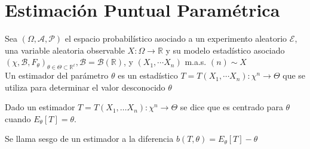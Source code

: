 \section{Estimación Puntual Paramétrica}

\begin{definición}[Estimador]
  Sea $(\Omega, \mathcal{A}, \mathcal{P})$ el espacio probabilístico asociado a un experimento aleatorio $\mathcal{E}$, una variable aleatoria observable $X: \Omega \longrightarrow \mathbb{R}$ y su modelo estadístico asociado $\left(\chi, \mathcal{B}, F_{\theta}\right)_{\theta \in \Theta \subset \mathbb{R}^{\ell}}, \mathcal{B}=\mathcal{B}(\mathbb{R})$, y $\left(X_{1}, \cdots X_{n}\right)$ m.a.s. $(n) \sim X$
  \\Un estimador del parámetro $\theta$ es un estadístico $T=T\left(X_{1}, \cdots X_{n}\right): \chi^{n} \longrightarrow \Theta$ que se utiliza para determinar el valor desconocido $\theta$
\end{definición}

\begin{definición}
  Dado un estimador $T = T(X_1, \ldots X_n): \chi^{n} \to \Theta$ se dice que es centrado para $\theta$ cuando $E_{\theta}[T] = \theta$. 
\end{definición}

\begin{definición}[Sesgo]
  Se llama sesgo de un estimador a la diferencia $b(T, \theta) = E_{\theta}[T] - \theta$
\end{definición}


